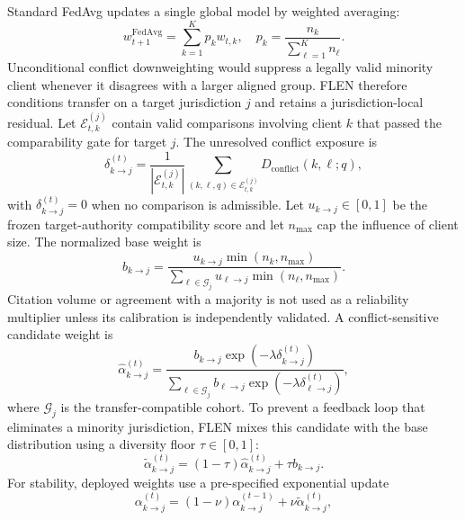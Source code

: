 \documentclass[a4paper,fleqn]{cas-sc}
\begin{document}
Standard FedAvg updates a single global model by weighted averaging:
\begin{equation}
    w_{t+1}^{\mathrm{FedAvg}} = \sum_{k=1}^{K}p_k w_{t,k},
    \quad p_k=\frac{n_k}{\sum_{\ell=1}^{K}n_\ell}.
\end{equation}
Unconditional conflict downweighting would suppress a legally valid minority client whenever it disagrees with a larger aligned group. FLEN therefore conditions transfer on a target jurisdiction $j$ and retains a jurisdiction-local residual. Let $\mathcal{E}_{t,k}^{(j)}$ contain valid comparisons involving client $k$ that passed the comparability gate for target $j$. The unresolved conflict exposure is
\begin{equation}
    \delta_{k\rightarrow j}^{(t)} =
    \frac{1}{|\mathcal{E}_{t,k}^{(j)}|}
    \sum_{(k,\ell,q)\in\mathcal{E}_{t,k}^{(j)}}
    D_{\mathrm{conflict}}(k,\ell;q),
\end{equation}
with $\delta_{k\rightarrow j}^{(t)}=0$ when no comparison is admissible. Let $u_{k\rightarrow j}\in[0,1]$ be the frozen target-authority compatibility score and let $n_{\max}$ cap the influence of client size. The normalized base weight is
\begin{equation}
    b_{k\rightarrow j}=
    \frac{u_{k\rightarrow j}\min(n_k,n_{\max})}
    {\sum_{\ell\in\mathcal{G}_j}u_{\ell\rightarrow j}\min(n_\ell,n_{\max})}.
\end{equation}
Citation volume or agreement with a majority is not used as a reliability multiplier unless its calibration is independently validated. A conflict-sensitive candidate weight is
\begin{equation}
    \widehat{\alpha}_{k\rightarrow j}^{(t)} =
    \frac{b_{k\rightarrow j}\exp(-\lambda \delta_{k\rightarrow j}^{(t)})}
    {\sum_{\ell\in\mathcal{G}_j}b_{\ell\rightarrow j}
    \exp(-\lambda \delta_{\ell\rightarrow j}^{(t)})},
\end{equation}
where $\mathcal{G}_j$ is the transfer-compatible cohort. To prevent a feedback loop that eliminates a minority jurisdiction, FLEN mixes this candidate with the base distribution using a diversity floor $\tau\in[0,1]$:
\begin{equation}
    \widetilde{\alpha}_{k\rightarrow j}^{(t)} =
    (1-\tau)\widehat{\alpha}_{k\rightarrow j}^{(t)}
    + \tau b_{k\rightarrow j}.
\end{equation}
For stability, deployed weights use a pre-specified exponential update
\begin{equation}
    \alpha_{k\rightarrow j}^{(t)}=
    (1-\nu)\alpha_{k\rightarrow j}^{(t-1)}
    +\nu\widetilde{\alpha}_{k\rightarrow j}^{(t)},
\end{equation}
\end{document}

